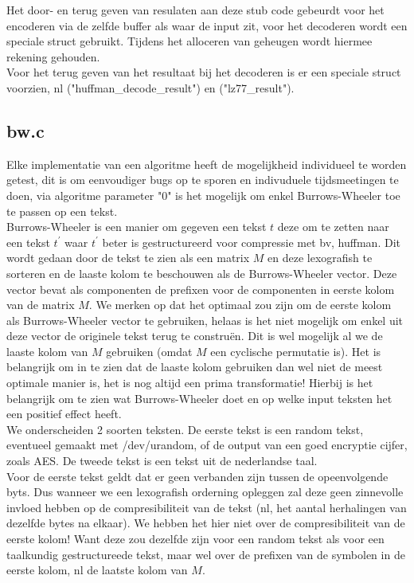 \documentclass[10pt,a4paper]{report}
\begin{document}
Het door- en terug geven van resulaten aan deze stub code gebeurdt voor het encoderen via de zelfde buffer als waar de input zit, voor het decoderen wordt een speciale struct gebruikt. Tijdens het alloceren van geheugen wordt hiermee rekening gehouden.\\

Voor het terug geven van het resultaat bij het decoderen is er een speciale struct voorzien, nl ("huffman\_decode\_result") en ("lz77\_result"). 
\subsection*{bw.c}
Elke implementatie van een algoritme heeft de mogelijkheid individueel te worden getest, dit is om eenvoudiger bugs op te sporen en indivuduele tijdsmeetingen te doen, via algoritme parameter "0" is het mogelijk om enkel Burrows-Wheeler toe te passen op een tekst.\\

Burrows-Wheeler is een manier om gegeven een tekst $t$ deze om te zetten naar een tekst $t^{'}$ waar $t^{'}$ beter is gestructureerd voor compressie met bv, huffman. Dit wordt gedaan door de tekst te zien als een matrix $M$ en deze lexografish te sorteren en de laaste kolom te beschouwen als de Burrows-Wheeler vector. Deze vector bevat als componenten de prefixen voor de componenten in eerste kolom van de matrix $M$. We merken op dat het optimaal zou zijn om de eerste kolom als Burrows-Wheeler vector te gebruiken, helaas is het niet mogelijk om enkel uit deze vector de originele tekst terug te constru\"en. Dit is wel mogelijk al we de laaste kolom van $M$ gebruiken (omdat $M$ een cyclische permutatie is). Het is belangrijk om in te zien dat de laaste kolom gebruiken dan wel niet de meest optimale manier is, het is nog altijd een prima transformatie! Hierbij is het belangrijk om te zien wat Burrows-Wheeler doet en op welke input teksten het een positief effect heeft. \\

We onderscheiden 2 soorten teksten. De eerste tekst is een random tekst, eventueel gemaakt met /dev/urandom, of de output van een goed encryptie cijfer, zoals AES. De tweede tekst is een tekst uit de nederlandse taal. \\
Voor de eerste tekst geldt dat er geen verbanden zijn tussen de opeenvolgende byts. Dus wanneer we een lexografish orderning opleggen zal deze geen zinnevolle invloed hebben op de compresibiliteit van de tekst (nl, het aantal herhalingen van dezelfde bytes na elkaar). We hebben het hier niet over de compresibiliteit van de eerste kolom! Want deze zou dezelfde zijn voor een random tekst als voor een taalkundig gestructureede tekst, maar wel over de prefixen van de symbolen in de eerste kolom, nl de laatste kolom van $M$.
\end{document}
